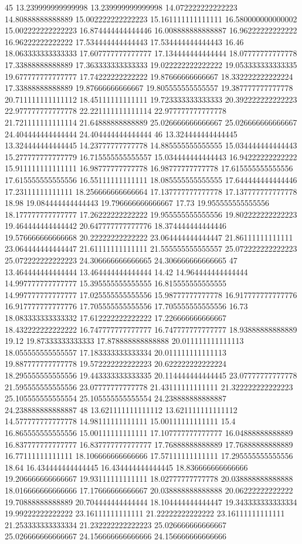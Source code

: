 45 13.239999999999998 13.239999999999998 14.072222222222223 14.80888888888889 15.002222222222223 15.161111111111111 16.580000000000002 15.002222222222223 16.874444444444446 16.008888888888887 16.96222222222222 16.96222222222222 17.534444444444443 17.534444444444443 16.46 18.063333333333333 17.607777777777777 17.134444444444444 18.07777777777778 17.33888888888889 17.363333333333333 19.022222222222222 19.053333333333335 19.677777777777777 17.74222222222222 19.87666666666667 18.332222222222224 17.33888888888889 19.87666666666667 19.805555555555557 19.387777777777778 20.711111111111112 18.45111111111111 19.723333333333333 20.392222222222223 22.977777777777778 22.221111111111114 22.977777777777778 21.721111111111114 21.64888888888889 25.026666666666667 25.026666666666667 24.404444444444444 24.404444444444444
46 13.324444444444445 13.324444444444445 14.23777777777778 14.885555555555555 15.034444444444443 15.277777777777779 16.715555555555557 15.034444444444443 16.94222222222222 15.911111111111111 16.98777777777778 16.98777777777778 17.615555555555556 17.615555555555556 16.55111111111111 18.085555555555555 17.644444444444446 17.23111111111111 18.256666666666664 17.137777777777778 17.137777777777778 18.98 19.084444444444443 19.796666666666667 17.73 19.955555555555556 18.177777777777777 17.26222222222222 19.955555555555556 19.802222222222223 19.464444444444442 20.647777777777776 18.374444444444446 19.576666666666668 20.22222222222222 23.064444444444447 21.86111111111111 23.064444444444447 21.61111111111111 21.555555555555557 25.072222222222223 25.072222222222223 24.306666666666665 24.306666666666665
47 13.464444444444444 13.464444444444444 14.42 14.964444444444444 14.997777777777777 15.395555555555555 16.815555555555555 14.997777777777777 17.025555555555556 15.98777777777778 16.917777777777776 16.917777777777776 17.705555555555556 17.705555555555556 16.73 18.083333333333332 17.612222222222222 17.226666666666667 18.432222222222222 16.747777777777777 16.747777777777777 18.93888888888889 19.12 19.87333333333333 17.878888888888888 20.011111111111113 18.055555555555557 17.183333333333334 20.011111111111113 19.887777777777778 19.572222222222223 20.622222222222224 18.295555555555556 19.443333333333335 20.114444444444445 23.07777777777778 21.595555555555556 23.07777777777778 21.43111111111111 21.322222222222223 25.105555555555554 25.105555555555554 24.238888888888887 24.238888888888887
48 13.621111111111112 13.621111111111112 14.577777777777778 14.98111111111111 15.00111111111111 15.4 16.865555555555556 15.00111111111111 17.107777777777777 16.04888888888889 16.837777777777777 16.837777777777777 17.76888888888889 17.76888888888889 16.77111111111111 18.106666666666666 17.57111111111111 17.295555555555556 18.64 16.434444444444445 16.434444444444445 18.836666666666666 19.206666666666667 19.93111111111111 18.02777777777778 20.038888888888888 18.016666666666666 17.17666666666667 20.038888888888888 20.06222222222222 19.70888888888889 20.704444444444444 18.104444444444447 19.343333333333334 19.99222222222222 23.16111111111111 21.22222222222222 23.16111111111111 21.253333333333334 21.232222222222223 25.026666666666667 25.026666666666667 24.156666666666666 24.156666666666666
